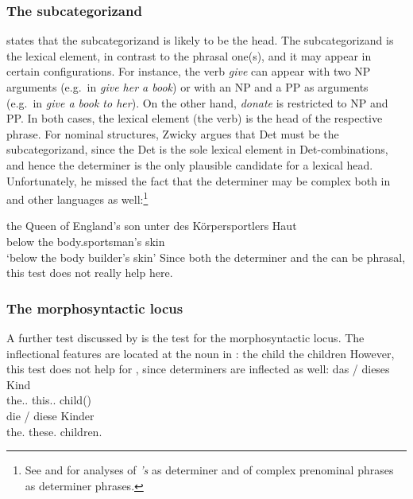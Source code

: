 \documentclass[output=paper
  ,nobabel
  ,draftmode
  ,uniformtopskip %
  ,colorlinks, citecolor=brown
]{langscibook}
\begin{document}
\subsubsection{The subcategorizand}

\largerpage
\citet[Section~2.1.2]{Zwicky85a} states that the subcategorizand is likely to be the head. The
subcategorizand is the lexical element, in contrast to the phrasal one(s), and it may appear in certain configurations. For instance,
the verb \emph{give} can appear with two NP arguments (e.g.\ in \emph{give her a book}) or with an NP and a PP as arguments (e.g.\ in \emph{give a book to her}). 
On the other hand, \emph{donate} is restricted to NP and PP. 
In both cases, the lexical element (the verb) is the head of the respective phrase.
For nominal structures, Zwicky argues that Det must be the subcategorizand, since the Det is the sole lexical
element in Det-\nbar combinations, and hence the determiner is the only plausible candidate for a
lexical head.
Unfortunately, he missed the fact that the determiner may be complex both in  and other
languages as well:\footnote{%
  See  and  for analyses of \emph{'s} as determiner and
  of complex prenominal phrases as determiner phrases.
}
\newpage

\eal
\ex the Queen of England's son
\ex 
\gll unter des Körpersportlers Haut\footnotemark\\
     below the body.sportsman's skin\\
\glt `below the body builder's skin'
\zl
Since both the determiner and the \nbar can be phrasal, this test does not really help here.

\subsubsection{The morphosyntactic locus}

A further test discussed by \citet[Section~2.1.3]{Zwicky85a} is the test for the morphosyntactic
locus. The inflectional features are located at the noun in :
\eal
\ex the child
\ex the children
\zl
However, this test does not help for , since determiners are inflected as well:
\eal
\ex 
\gll das / dieses Kind\\
     the.\SG.\N{} {} this.\SG.\N{} child(\N)\\
\ex 
\gll die / diese Kinder\\
     the.\PL{} {} these.\PL{} children.\PL\\
\zl
\end{document}
